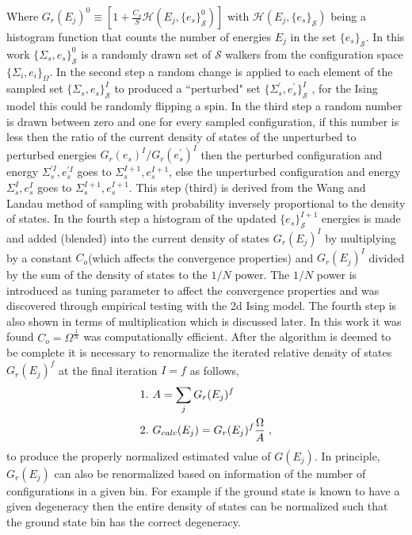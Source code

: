 \documentclass[aps,pre,reprint,superscriptaddress,showkeys]{revtex4-1}
\begin{document}
Where  $G_{r}(E_j)^0 \equiv [1 +  \frac{C_o}{S}\mathcal{H}(E_j,\{e_s\}_{\mathcal{S}}^0)]$ with $\mathcal{H}(E_j,\{e_s\}_{\mathcal{S}})$ being a histogram function that counts the number of energies $E_j$ in the set $\{e_s\}_{\mathcal{S}}$. In this work $\{\Sigma_{s},e_s\}_{\mathcal{S}}^0$  is a randomly drawn set of $\mathcal{S}$ walkers from the configuration space $\{ \Sigma_i, e_i \}_\Omega $. In the second step  a random change is applied to each element of the sampled set $\{\Sigma_{s},e_s\}_{\mathcal{S}}^I$ to produced a ``perturbed" set $ \{\Sigma_{s}^{'},e_s^{'}\}_{\mathcal{S}}^I$ , for the Ising model this could be randomly flipping a spin.  In the third step a random number is drawn between zero and one for every sampled configuration, if this number is less then the ratio of the current density of states of the unperturbed to perturbed energies $G_{r}(e_s)^{I}/G_{r}(e_s^{'})^{I}$ then the perturbed configuration and energy  $\Sigma_{s}^{'I},e_s^{'I}$  goes to $\Sigma_{s}^{I+1},e_s^{I+1}$,  else the unperturbed configuration and energy $\Sigma_{s}^{I},e_s^I$  goes to $\Sigma_{s}^{I+1},e_s^{I+1}$. This step (third) is derived from the Wang and Landau method of sampling with probability inversely proportional to the density of states.  In the fourth step a histogram of the updated $\{ e_s \}^{I+1}_{\mathcal{S}}$ energies is made and added (blended) into the current density of states $G_{r}(E_j)^I$   by multiplying  by a constant $C_{o}$(which affects the convergence properties) and   $G_{r}(E_j)^{I}$ divided by the sum of the density of states to the $1/N$ power. The $1/N$ power is introduced as tuning parameter to affect the convergence properties and was discovered through empirical testing with the 2d Ising model.  The fourth step is also shown in terms of multiplication which is discussed later. In this work it was found  $C_{o}=\Omega^{\frac{1}{N}}$ was computationally efficient. After the algorithm is deemed to be complete it is necessary to renormalize the iterated relative density of states $G_{r}(E_j)^f$ at the final iteration $I=f$ as follows, 
\begin{equation}
\begin{split}
&1. \hspace{0.125cm} A = \sum_jG_{r}(E_j)^f\\
&2. \hspace{0.125cm} G_{calc}(E_j) = G_{r}(E_j)^f \frac{\Omega}{A} \;,
\end{split}
\label{renormalize}
\end{equation}
to produce the properly normalized estimated value of $G(E_j)$. In principle, $G_{r}(E_j)$ can also be renormalized based on information of the number of configurations in a given bin. For example if the ground state is known to have a given degeneracy then the entire density of states can be normalized such that the ground state bin has the correct degeneracy. 
\end{document}
